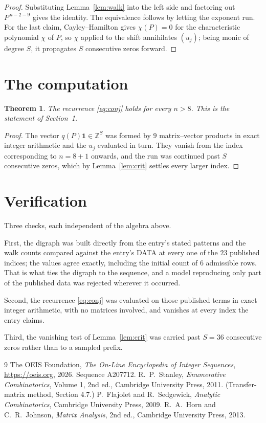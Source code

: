\documentclass[11pt,a4paper]{article}
\theoremstyle{plain}
\newtheorem{theorem}{Theorem}
\theoremstyle{definition}
\begin{document}
\begin{proof}
Substituting Lemma~\ref{lem:walk} into the left side and factoring out
$P^{\,n-2-9}$ gives the identity. The equivalence follows by letting the exponent
run. For the last claim, Cayley--Hamilton gives $\chi(P)=0$ for the characteristic
polynomial $\chi$ of $P$, so $\chi$ applied to the shift annihilates $(u_j)$; being monic of
degree $S$, it propagates $S$ consecutive zeros forward.
\end{proof}

\section{The computation}

\begin{theorem}
The recurrence \eqref{eq:conj} holds for every $n>8$. This is the statement of
Section~1.
\end{theorem}

\begin{proof}
The vector $q(P)\mathbf{1}\in\mathbb{Z}^{S}$ was formed by $9$ matrix--vector
products in exact integer arithmetic and the $u_j$ evaluated in turn. They vanish from the
index corresponding to $n=8+1$ onwards, and the run was continued past $S$ consecutive
zeros, which by Lemma~\ref{lem:crit} settles every larger index.
\end{proof}

\section{Verification}

Three checks, each independent of the algebra above.

First, the digraph was built directly from the entry's stated patterns and the walk counts
compared against the entry's DATA at every one of the $23$ published indices; the
values agree exactly, including the initial count of $6$ admissible rows. That is
what ties the digraph to the sequence, and a model reproducing only part of the published
data was rejected wherever it occurred.

Second, the recurrence \eqref{eq:conj} was evaluated on those published terms in exact
integer arithmetic, with no matrices involved, and vanishes at every index the entry claims.

Third, the vanishing test of Lemma~\ref{lem:crit} was carried past $S=36$ consecutive
zeros rather than to a sampled prefix.

\begin{thebibliography}{9}
 The OEIS Foundation, \emph{The On-Line Encyclopedia of Integer
Sequences}, \url{https://oeis.org}, 2026. Sequence A207712.
 R.~P.~Stanley, \emph{Enumerative Combinatorics}, Volume 1, 2nd ed.,
Cambridge University Press, 2011. (Transfer-matrix method, Section 4.7.)
 P.~Flajolet and R.~Sedgewick, \emph{Analytic Combinatorics}, Cambridge
University Press, 2009.
 R.~A.~Horn and C.~R.~Johnson, \emph{Matrix Analysis}, 2nd ed., Cambridge
University Press, 2013.
\end{thebibliography}
\end{document}
